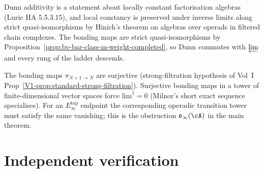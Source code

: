 \begin{remark}
\label{rem:weight-completed-dunn-pairing-preservation}
Dunn additivity is a statement about locally constant
factorisation algebras (Lurie HA 5.5.3.15), and local constancy is
preserved under inverse limits along strict quasi-isomorphisms by
Hinich's theorem on algebras over operads in filtered chain complexes.
The bonding maps are strict quasi-isomorphisms by
Proposition~\ref{prop:bv-bar-class-m-weight-completed}, so Dunn
commutes with $\varprojlim$ and every rung of the ladder descends.
\end{remark}

\begin{remark}
\label{rem:weight-completed-mittag-leffler-obstruction}
The bonding maps $\pi_{N + 1 \to N}$ are surjective
(strong-filtration hypothesis of Vol~I
Prop~\ref{V1-prop:standard-strong-filtration}). Surjective bonding
maps in a tower of finite-dimensional vector spaces force $\mathrm{lim}^1
= 0$ (Milnor's short exact sequence specialises). For an
$E_\infty^{\mathrm{top}}$ endpoint the corresponding operadic
transition tower must satisfy the same vanishing; this is the
obstruction $\mathfrak{o}_{\infty}(\cA)$ in the main theorem.
\end{remark}

\section{Independent verification}
\label{sec:weight-completed-topologization-iv}

